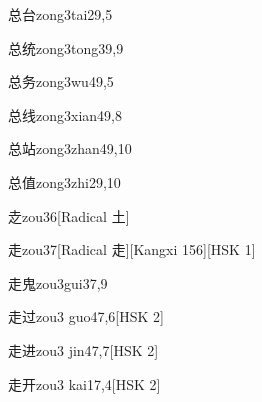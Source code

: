 \begin{entry}{总台}{zong3tai2}{9,5}
\end{entry}

\begin{entry}{总统}{zong3tong3}{9,9}
\end{entry}

\begin{entry}{总务}{zong3wu4}{9,5}
\end{entry}

\begin{entry}{总线}{zong3xian4}{9,8}
\end{entry}

\begin{entry}{总站}{zong3zhan4}{9,10}
\end{entry}

\begin{entry}{总值}{zong3zhi2}{9,10}
\end{entry}

\begin{entry}{赱}{zou3}{6}[Radical 土]
\end{entry}

\begin{entry}{走}{zou3}{7}[Radical 走][Kangxi 156][HSK 1]
\end{entry}

\begin{entry}{走鬼}{zou3gui3}{7,9}
\end{entry}

\begin{entry}{走过}{zou3 guo4}{7,6}[HSK 2]
\end{entry}

\begin{entry}{走进}{zou3 jin4}{7,7}[HSK 2]
\end{entry}

\begin{entry}{走开}{zou3 kai1}{7,4}[HSK 2]
\end{entry}

